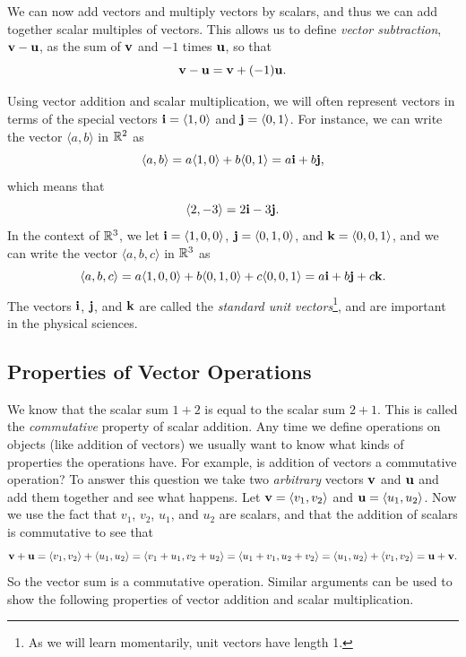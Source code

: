 

%

We can now add vectors and multiply vectors by scalars, and thus we
can add together scalar multiples of vectors. This allows us to define
\emph{vector subtraction}, $\mathbf{v} - \mathbf{u}$, as
the sum of $\mathbf{v}$ and $-1$ times $\mathbf{u}$, so that
\[\mathbf{v} - \mathbf{u} = \mathbf{v} + (-1)\mathbf{u}.\]

%


Using vector addition and scalar multiplication, we will often
represent vectors in terms of the special vectors $\mathbf{i} =
\langle 1, 0 \rangle$ and $\mathbf{j} = \langle 0,1 \rangle$.  For instance,
we can write 
the vector $\langle a, b \rangle$ in $\mathbb{R}^2$ as
\[\langle a, b \rangle = a\langle 1, 0 \rangle + b\langle 0, 1 \rangle = a\mathbf{i} + b \mathbf{j},\]
which means that
\[\langle 2, -3 \rangle = 2\mathbf{i} - 3\mathbf{j}.\]
In the context of $\mathbb{R}^3$, we let $\mathbf{i} = \langle 1, 0, 0 \rangle$, $\mathbf{j} = \langle 0,1,0 \rangle$, and $\mathbf{k} = \langle 0,0,1 \rangle$, and we can write the vector $\langle a, b, c \rangle$ in $\mathbb{R}^3$ as
\[\langle a, b,c \rangle = a\langle 1, 0,0 \rangle + b\langle 0, 1,0 \rangle + c\langle 0,0,1 \rangle = a\mathbf{i} + b \mathbf{j} + c\mathbf{k}.\]
The vectors $\mathbf{i}$, $\mathbf{j}$, and $\mathbf{k}$ are called the \emph{standard unit vectors}\footnote{As we will learn momentarily, unit vectors have length 1.}, and are important in the physical sciences.

\subsection*{Properties of Vector Operations}

We know that the scalar sum $1+2$ is equal to the scalar sum
$2+1$. This is called the \emph{commutative} property of scalar
addition. Any time we define operations on objects (like addition of
vectors) we usually want to know what kinds of properties the
operations have. For example, is addition of vectors a commutative
operation? To answer this question we take two \emph{arbitrary}
vectors $\mathbf{v}$ and $\mathbf{u}$ and add them together and see what
happens. Let $\mathbf{v} = \langle v_1, v_2 \rangle$ and $\mathbf{u} = \langle u_1,
u_2 \rangle$. Now we use the fact that $v_1$, $v_2$, $u_1$, and $u_2$
are scalars, and that the addition of scalars is commutative to see
that
\[\mathbf{v} + \mathbf{u} = \langle v_1, v_2 \rangle + \langle u_1, u_2 \rangle = \langle v_1+u_1, v_2 + u_2 \rangle = \langle u_1+v_1, u_2+v_2 \rangle = \langle u_1, u_2 \rangle + \langle v_1, v_2 \rangle = \mathbf{u} + \mathbf{v}.\]
So the vector sum is a commutative operation. Similar arguments can be
used to show the following properties of vector addition and scalar
multiplication. 

